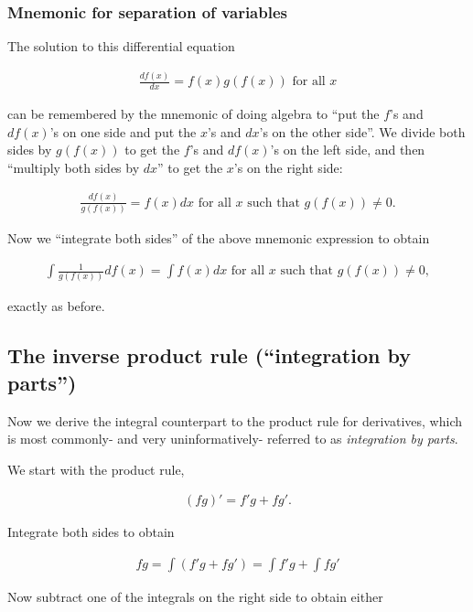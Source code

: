 \subsubsection*{Mnemonic for separation of variables}

The solution to this differential equation

\begin{align*}
    \frac{df(x)}{dx} = f(x) g(f(x)) \text{ for all $x$}
\end{align*}

can be remembered by the mnemonic of doing algebra to ``put the $f$'s and $df(x)$'s on one side and put the $x$'s and $dx$'s on the other side''. We divide both sides by $g(f(x))$ to get the $f$'s and $df(x)$'s on the left side, and then ``multiply both sides by $dx$'' to get the $x$'s on the right side: 

\begin{align*}
    \frac{df(x)}{g(f(x))} = f(x) dx \text{ for all $x$ such that $g(f(x)) \neq 0$}.
\end{align*}

Now we ``integrate both sides'' of the above mnemonic expression to obtain

\begin{align*}
    \int \frac{1}{g(f(x))} df(x) = \int f(x) dx \text{ for all $x$ such that $g(f(x)) \neq 0$},
\end{align*}

exactly as before.

\subsection*{The inverse product rule (``integration by parts'')}

Now we derive the integral counterpart to the product rule for derivatives, which is most commonly- and very uninformatively- referred to as \textit{integration by parts}. 

We start with the product rule,

\begin{align*}
	(fg)' = f'g + fg'.
\end{align*}

Integrate both sides to obtain

\begin{align*}
	fg = \int (f'g + fg') = \int f'g + \int fg'
\end{align*}

Now subtract one of the integrals on the right side to obtain either

